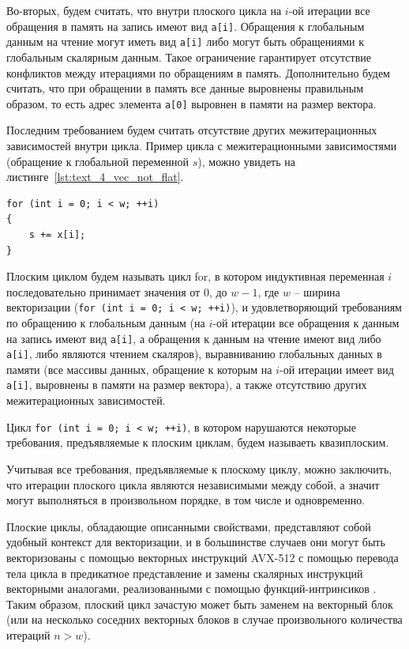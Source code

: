 Во-вторых, будем считать, что внутри плоского цикла на $i$-ой итерации все обращения в память на запись имеют вид \texttt{a[i]}.
Обращения к глобальным данным на чтение могут иметь вид \texttt{a[i]} либо могут быть обращениями к глобальным скалярным данным.
Такое ограничение гарантирует отсутствие конфликтов между итерациями по обращениям в память.
Дополнительно будем считать, что при обращении в память все данные выровнены правильным образом, то есть адрес элемента \texttt{a[0]} выровнен в памяти на размер вектора.

Последним требованием будем считать отсутствие других межитерационных зависимостей внутри цикла.
Пример цикла с межитерационными зависимостями (обращение к глобальной переменной $s$), можно увидеть на листинге~\ref{lst:text_4_vec_not_flat}.

\begin{lstlisting}[caption={Пример цикла с межитерационной зависимостью.},label={lst:text_4_vec_not_flat}]
for (int i = 0; i < w; ++i)
{
   	s += x[i];
}
\end{lstlisting}

\begin{definition}
Плоским циклом будем называть цикл for, в котором индуктивная переменная $i$ последовательно принимает значения от $0$, до $w - 1$, где $w$ -- ширина векторизации (\texttt{for (int i = 0; i < w; ++i)}), и удовлетворяющий требованиям по обращению к глобальным данным (на $i$-ой итерации все обращения к данным на запись имеют вид \texttt{a[i]}, а обращения к данным на чтение имеют вид либо \texttt{a[i]}, либо являются чтением скаляров), выравниванию глобальных данных в памяти (все массивы данных, обращение к которым на $i$-ой итерации имеет вид \texttt{a[i]}, выровнены в памяти на размер вектора), а также отсутствию других межитерационных зависимостей.
\end{definition}

\begin{definition}
Цикл \texttt{for (int i = 0; i < w; ++i)}, в котором нарушаются некоторые требования, предъявляемые к плоским циклам, будем называеть квазиплоским.
\end{definition}

Учитывая все требования, предъявляемые к плоскому циклу, можно заключить, что итерации плоского цикла являются независимыми между собой, а значит могут выполняться в произвольном порядке, в том числе и одновременно.

Плоские циклы, обладающие описанными свойствами, представляют собой удобный контекст для векторизации, и в большинстве случаев они могут быть векторизованы с помощью векторных инструкций AVX-512 с помощью перевода тела цикла в предикатное представление и замены скалярных инструкций векторными аналогами, реализованными с помощью функций-интринсиков \cite{IntelIntrinsicsGuide,Savin2020VecFlat}.
Таким образом, плоский цикл зачастую может быть заменем на векторный блок (или на несколько соседних векторных блоков в случае произвольного количества итераций $n > w$).

